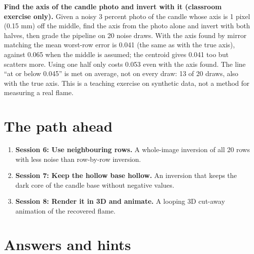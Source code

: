 \documentclass[11pt,a4paper]{article}
\begin{document}
\textbf{Find the axis of the candle photo and invert with it (classroom exercise only).} Given a noisy 3 percent photo of the candle whose axis is 1 pixel (0.15 mm) off the middle, find the axis from the photo alone and invert with both halves, then grade the pipeline on 20 noise draws. With the axis found by mirror matching the mean worst-row error is 0.041 (the same as with the true axis), against 0.065 when the middle is assumed; the centroid gives 0.041 too but scatters more. Using one half only costs 0.053 even with the axis found. The line ``at or below 0.045'' is met on average, not on every draw: 13 of 20 draws, also with the true axis. This is a teaching exercise on synthetic data, not a method for measuring a real flame.

\section{The path ahead}
\begin{enumerate}[nosep]
\item \textbf{Session 6: Use neighbouring rows.} A whole-image inversion of all 20 rows with less noise than row-by-row inversion.
\item \textbf{Session 7: Keep the hollow base hollow.} An inversion that keeps the dark core of the candle base without negative values.
\item \textbf{Session 8: Render it in 3D and animate.} A looping 3D cut-away animation of the recovered flame.
\end{enumerate}

\section{Answers and hints}
\end{document}
